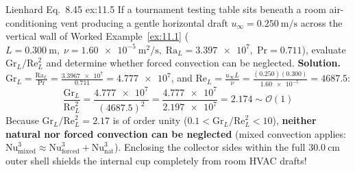\begin{workedexample}{Lienhard Eq.\ 8.45 }{ex:11.5}
If a tournament testing table sits beneath a room air-conditioning vent producing a gentle horizontal draft $u_\infty = \SI{0.250}{\meter\per\second}$ across the vertical wall of Worked Example~\ref{ex:11.1} ($L = \SI{0.300}{\meter},\; \nu = \SI{1.60e-5}{\square\meter\per\second},\; \mathrm{Ra}_L = \num{3.397e7},\; \mathrm{Pr} = 0.711$), evaluate $\mathrm{Gr}_L / \mathrm{Re}_L^2$ and determine whether forced convection can be neglected.
\tcblower
\textbf{Solution.} $\mathrm{Gr}_L = \frac{\mathrm{Ra}_L}{\mathrm{Pr}} = \frac{\num{3.3967e7}}{0.711} = \num{4.777e7}$, and $\mathrm{Re}_L = \frac{u_\infty L}{\nu} = \frac{(0.250)(0.300)}{\SI{1.60e-5}{}} = \mathbf{4687.5}$:
\[
  \frac{\mathrm{Gr}_L}{\mathrm{Re}_L^2} = \frac{\num{4.777e7}}{(4687.5)^2} = \frac{\num{4.777e7}}{\num{2.197e7}} = \mathbf{2.174} \sim \mathcal{O}(1)
\]
Because $\mathrm{Gr}_L/\mathrm{Re}_L^2 = 2.17$ is of order unity ($0.1 < \mathrm{Gr}_L/\mathrm{Re}_L^2 < 10$), \textbf{neither natural nor forced convection can be neglected} (mixed convection applies: $\mathrm{Nu}_{\mathrm{mixed}}^3 \approx \mathrm{Nu}_{\mathrm{forced}}^3 + \mathrm{Nu}_{\mathrm{nat}}^3$). Enclosing the collector sides within the full $\SI{30.0}{\centi\meter}$ outer shell shields the internal cup completely from room HVAC drafts!
\end{workedexample}

